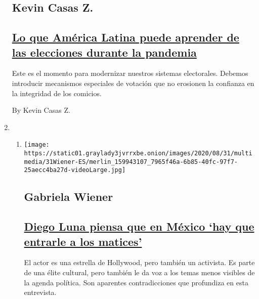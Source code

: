 \begin{enumerate}
  \hypertarget{kevin-casas-z}{%
  \subsection{Kevin Casas Z.}\label{kevin-casas-z}}

  \hypertarget{lo-que-amuxe9rica-latina-puede-aprender-de-las-elecciones-durante-la-pandemia}{%
  \subsection{\texorpdfstring{\href{/es/2020/09/02/espanol/opinion/elecciones-coronavirus.html}{Lo
  que América Latina puede aprender de las elecciones durante la
  pandemia}}{Lo que América Latina puede aprender de las elecciones durante la pandemia}}\label{lo-que-amuxe9rica-latina-puede-aprender-de-las-elecciones-durante-la-pandemia}}

  Este es el momento para modernizar nuestros sistemas electorales.
  Debemos introducir mecanismos especiales de votación que no erosionen
  la confianza en la integridad de los comicios.

  By Kevin Casas Z.
\item
  \begin{enumerate}
  \def\labelenumii{\arabic{enumii}.}
  \item
    \texttt{[image: https://static01.graylady3jvrrxbe.onion/images/2020/08/31/multimedia/31Wiener-ES/merlin\_159943107\_7965f46a-6b85-40fc-97f7-25aecc4ba27d-videoLarge.jpg]}

    \hypertarget{gabriela-wiener}{%
    \subsection{Gabriela Wiener}\label{gabriela-wiener}}

    \hypertarget{diego-luna-piensa-que-en-muxe9xico-hay-que-entrarle-a-los-matices}{%
    \subsection{\texorpdfstring{\href{/es/2020/08/31/espanol/opinion/diego-luna-pan-y-circo.html}{Diego
    Luna piensa que en México `hay que entrarle a los
    matices'}}{Diego Luna piensa que en México `hay que entrarle a los matices'}}\label{diego-luna-piensa-que-en-muxe9xico-hay-que-entrarle-a-los-matices}}

    El actor es una estrella de Hollywood, pero también un activista. Es
    parte de una élite cultural, pero también le da voz a los temas
    menos visibles de la agenda política. Son aparentes contradicciones
    que profundiza en esta entrevista.


\end{enumerate}
\end{enumerate}
